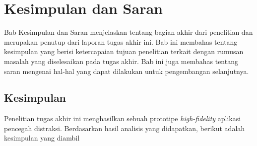 \chapter{Kesimpulan dan Saran}

Bab Kesimpulan dan Saran menjelaskan tentang bagian akhir dari penelitian dan merupakan penutup dari laporan tugas akhir ini. Bab ini membahas tentang kesimpulan yang berisi ketercapaian tujuan penelitian terkait dengan rumusan masalah yang diselesaikan pada tugas akhir. Bab ini juga membahas tentang saran mengenai hal-hal yang dapat dilakukan untuk pengembangan selanjutnya.

\section{Kesimpulan}
Penelitian tugas akhir ini menghasilkan sebuah prototipe \textit{high-fidelity} aplikasi pencegah distraksi. Berdasarkan hasil analisis yang didapatkan, berikut adalah kesimpulan yang diambil


